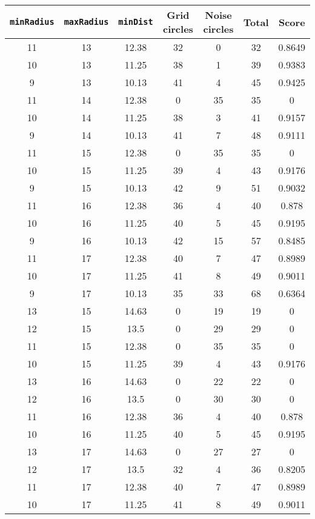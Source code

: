 \documentclass[letterpaper, 12pt]{article}
\begin{document}
\begin{longtable}{|c|c|c|c|c|c|c|}
\hline
\textbf{\texttt{minRadius}} & \textbf{\texttt{maxRadius}} & \textbf{\texttt{minDist}} & \textbf{Grid circles} & \textbf{Noise circles} & \textbf{Total} & \textbf{Score} \\
\hline
11 & 13 & 12.38 & 32 & 0 & 32 & 0.8649 \\
\hline
10 & 13 & 11.25 & 38 & 1 & 39 & 0.9383 \\
\hline
9 & 13 & 10.13 & 41 & 4 & 45 & 0.9425 \\
\hline
11 & 14 & 12.38 & 0 & 35 & 35 & 0 \\
\hline
10 & 14 & 11.25 & 38 & 3 & 41 & 0.9157 \\
\hline
9 & 14 & 10.13 & 41 & 7 & 48 & 0.9111 \\
\hline
11 & 15 & 12.38 & 0 & 35 & 35 & 0 \\
\hline
10 & 15 & 11.25 & 39 & 4 & 43 & 0.9176 \\
\hline
9 & 15 & 10.13 & 42 & 9 & 51 & 0.9032 \\
\hline
11 & 16 & 12.38 & 36 & 4 & 40 & 0.878 \\
\hline
10 & 16 & 11.25 & 40 & 5 & 45 & 0.9195 \\
\hline
9 & 16 & 10.13 & 42 & 15 & 57 & 0.8485 \\
\hline
11 & 17 & 12.38 & 40 & 7 & 47 & 0.8989 \\
\hline
10 & 17 & 11.25 & 41 & 8 & 49 & 0.9011 \\
\hline
9 & 17 & 10.13 & 35 & 33 & 68 & 0.6364 \\
\hline
13 & 15 & 14.63 & 0 & 19 & 19 & 0 \\
\hline
12 & 15 & 13.5 & 0 & 29 & 29 & 0 \\
\hline
11 & 15 & 12.38 & 0 & 35 & 35 & 0 \\
\hline
10 & 15 & 11.25 & 39 & 4 & 43 & 0.9176 \\
\hline
13 & 16 & 14.63 & 0 & 22 & 22 & 0 \\
\hline
12 & 16 & 13.5 & 0 & 30 & 30 & 0 \\
\hline
11 & 16 & 12.38 & 36 & 4 & 40 & 0.878 \\
\hline
10 & 16 & 11.25 & 40 & 5 & 45 & 0.9195 \\
\hline
13 & 17 & 14.63 & 0 & 27 & 27 & 0 \\
\hline
12 & 17 & 13.5 & 32 & 4 & 36 & 0.8205 \\
\hline
11 & 17 & 12.38 & 40 & 7 & 47 & 0.8989 \\
\hline
10 & 17 & 11.25 & 41 & 8 & 49 & 0.9011 \\

\end{longtable}
\end{document}
